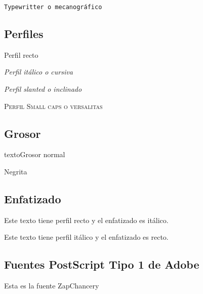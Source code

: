 \documentclass[11pt,a4paper]{article}
\begin{document}
\texttt{Typewritter o mecanográfico}



\subsection{Perfiles}


\textup{Perfil recto}

\textit{Perfil itálico o cursiva}

\textsl{Perfil slanted o inclinado}

\textsc{Perfil Small caps o versalitas}


\subsection{Grosor}


\textmd{textoGrosor normal}

Negrita



\subsection{Enfatizado}


Este texto tiene perfil recto y el enfatizado
es itálico.

Este texto tiene perfil itálico y el enfatizado
es recto.



\subsection{Fuentes PostScript Tipo 1 de Adobe}


{\fontsize{15pt}{18pt}\selectfont 
Esta es la fuente ZapChancery}
\end{document}
